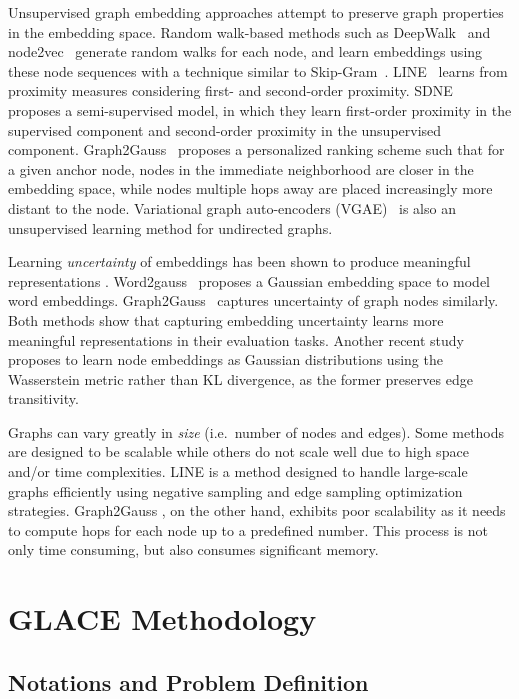 \documentclass[runningheads]{llncs}
\begin{document}
Unsupervised graph embedding approaches attempt to preserve graph properties in the embedding space. Random walk-based methods such as DeepWalk~\cite{DBLP:deepwalk} and node2vec~\cite{DBLP:node2vec} generate random walks for each node, and learn embeddings using these node sequences with a technique similar to Skip-Gram~\cite{mikolov2013distributed}. LINE~\cite{DBLP:line} learns from proximity measures considering first- and second-order proximity. SDNE~\cite{DBLP:sdne} proposes a semi-supervised model, in which they learn first-order proximity in the supervised component and second-order proximity in the unsupervised component. Graph2Gauss~\cite{g2g} proposes a personalized ranking scheme such that for a given anchor node, nodes in the immediate neighborhood are closer in the embedding space, while nodes multiple hops away are placed increasingly more distant to the node. Variational graph auto-encoders (VGAE)~\cite{DBLP:gae} is also an unsupervised learning method for undirected graphs.

Learning \emph{uncertainty} of embeddings has been shown to produce meaningful representations \cite{DBLP:word2gauss,g2g}. Word2gauss~\cite{DBLP:word2gauss} proposes a Gaussian embedding space to model word embeddings. Graph2Gauss~\cite{g2g} captures uncertainty of graph nodes similarly. Both methods show that capturing embedding uncertainty learns more meaningful representations in their evaluation tasks. Another recent study~\cite{DBLP:vne} proposes to learn node embeddings as Gaussian distributions using the Wasserstein metric rather than KL divergence, as the former preserves edge transitivity.

Graphs can vary greatly in \emph{size} (i.e.\ number of nodes and edges). Some methods are designed to be scalable while others do not scale well due to high space and/or time complexities. LINE \cite{DBLP:line} is a method designed to handle large-scale graphs efficiently using negative sampling and edge sampling optimization strategies. Graph2Gauss \cite{g2g}, on the other hand, exhibits poor scalability as it needs to compute hops for each node up to a predefined number. This process is not only time consuming, but also consumes significant memory. 
 \section{GLACE Methodology}

\subsection{Notations and Problem Definition}
\end{document}
